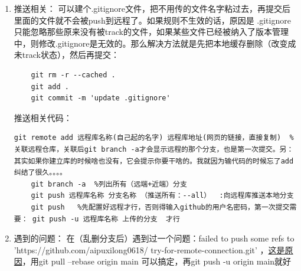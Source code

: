 \documentclass{article}
\begin{document}
\begin{enumerate}
\item 推送相关：
可以建个.gitignore文件，把不用传的文件名字粘过去，再提交后里面的文件就不会被push到远程了。如果规则不生效的话，原因是 .gitignore 只能忽略那些原来没有被track的文件，如果某些文件已经被纳入了版本管理中，则修改.gitignore是无效的。那么解决方法就是先把本地缓存删除（改变成未track状态），然后再提交：
\begin{lstlisting}
	git rm -r --cached .	
	git add .	
	git commit -m 'update .gitignore'
\end{lstlisting}
推送相关代码：
\begin{lstlisting}[breaklines=true]
	git remote add 远程库名称(自己起的名字) 远程库地址(网页的链接，直接复制)  %关联远程仓库，关联后git branch -a才会显示远程的那个分支，也是第一次提交。另：其实如果你建立库的时候啥也没有，它会提示你要干啥的。我就因为输代码的时候忘了add纠结了很久。。。。
	git branch -a  %列出所有（远端+近端）分支
	git push 远程库名称 分支名称 （推送所有：--all）  :向远程库推送本地分支
	git push   %先配置好远程才行，否则得输入github的用户名密码，第一次提交需要： git push -u 远程库名称 上传的分支  才行
\end{lstlisting}

\item 遇到的问题：
在（乱删分支后）遇到过一个问题：failed to push some refs to 'https://github.com/aipuxilong0618/
try-for-remote-connection.git' ，\href{https://www.cnblogs.com/Rainingday/p/12364690.html}{这是原因}，用git pull --rebase origin main
可以搞定，再git push -u origin main就好
\end{enumerate}
\end{document}
